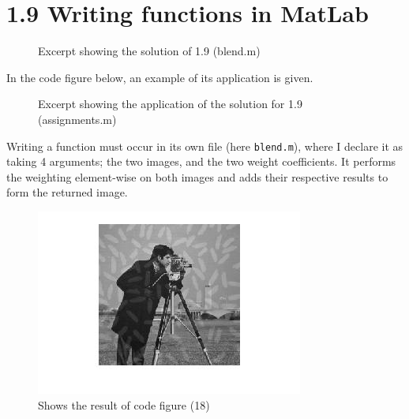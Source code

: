 \documentclass[11pt]{article}
\newcommand{\file}[1]{{\tt #1}}
\newcommand{\codefig}[5]
{
\begin{figure}[H]
    
    \caption{#5 (#2)}
    \label{code:#1}
\end{figure}
}
\begin{document}
\newpage
\section{1.9 \mdseries Writing functions in MatLab}
\label{sec:1-9}

\begin{multicols}{2}

\codefig{1-9-a}{blend.m}{1}{3}{Excerpt showing the solution of 1.9}

In the code figure below, an example of its application is given.

\codefig{1-9-b}{assignments.m}{109}{115}{Excerpt showing the application of
the solution for 1.9}

\vfill\columnbreak

Writing a function must occur in its own file (here \file{blend.m}), where I
declare it as taking 4 arguments; the two images, and the two weight
coefficients. It performs the weighting element-wise on both images and adds
their respective results to form the returned image.

\begin{figure}[H]
    \includegraphics[scale=0.75]{figures/1-9.jpg}
    \caption{Shows the result of code figure (18)}
\end{figure}

\end{multicols}
\end{document}
